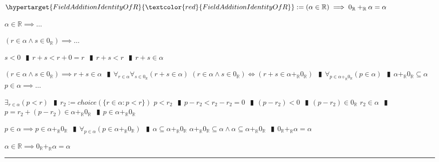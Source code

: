\documentclass{book}
\newcommand{\df}[1]{\hypertarget{#1}{\textcolor{red}{#1}}}
\newcommand{\abr}{:=}
\newcommand{\pipe}{$\phantom{(}\vrectangleblack\phantom{)}$}
\begin{document}
$\df{FieldAdditionIdentityOfR} \abr (\alpha \in \mathbb{R}) \implies 0_{\mathbb{R}} +_{\mathbb{R}} \alpha = \alpha$
\begin{enumerate}
  \lit $\alpha \in \mathbb{R} \implies \ldots$
  \begin{enumerate}
    \lit $(r \in \alpha \land s \in 0_{\mathbb{R}}) \implies \ldots$
    \begin{enumerate}
      \lit $s < 0$ \pipe $r + s < r + 0 = r$ \pipe $r + s < r$ \pipe $r + s \in \alpha$
    \end{enumerate}
    \lit $(r \in \alpha \land s \in 0_{\mathbb{R}}) \implies r + s \in \alpha$ \pipe $\forall_{r \in \alpha} \forall_{s \in 0_{\mathbb{R}}}(r + s \in \alpha)$
    \lit $(r \in \alpha \land s \in 0_{\mathbb{R}}) \iff (r + s \in \alpha +_{\mathbb{R}} 0_{\mathbb{R}})$ \pipe $\forall_{p \in \alpha +_{\mathbb{R}} 0_{\mathbb{R}}}(p \in \alpha)$ \pipe $\alpha +_{\mathbb{R}} 0_{\mathbb{R}} \subseteq \alpha$
    \lit $p \in \alpha \implies \ldots$
    \begin{enumerate}
      \lit $\exists_{r \in \alpha}(p < r)$ \pipe $r_2 \abr choice(\{r \in \alpha : p < r\})$
      \lit $p < r_2$ \pipe $p - r_2 < r_2 - r_2 = 0$ \pipe $(p - r_2 )< 0$ \pipe $(p - r_2) \in 0_{\mathbb{R}}$
      \lit $r_2 \in \alpha$ \pipe $p = r_2 + (p - r_2) \in \alpha +_{\mathbb{R}} 0_{\mathbb{R}}$ \pipe $p \in \alpha +_{\mathbb{R}} 0_{\mathbb{R}}$
    \end{enumerate}
    \lit $p \in \alpha \implies p \in \alpha +_{\mathbb{R}} 0_{\mathbb{R}}$ \pipe $\forall_{p \in \alpha}(p \in \alpha +_{\mathbb{R}} 0_{\mathbb{R}})$ \pipe $\alpha \subseteq \alpha +_{\mathbb{R}} 0_{\mathbb{R}}$
    \lit $\alpha +_{\mathbb{R}} 0_{\mathbb{R}} \subseteq \alpha \land \alpha \subseteq \alpha +_{\mathbb{R}} 0_{\mathbb{R}}$ \pipe $0_{\mathbb{R}} +_{\mathbb{R}} \alpha = \alpha$
  \end{enumerate}
  \lit $\alpha \in \mathbb{R} \implies 0_{\mathbb{R}} +_{\mathbb{R}} \alpha = \alpha$
\end{enumerate} \vspace{.75mm} \hrule \vspace{.75mm} \ \\
\end{document}
